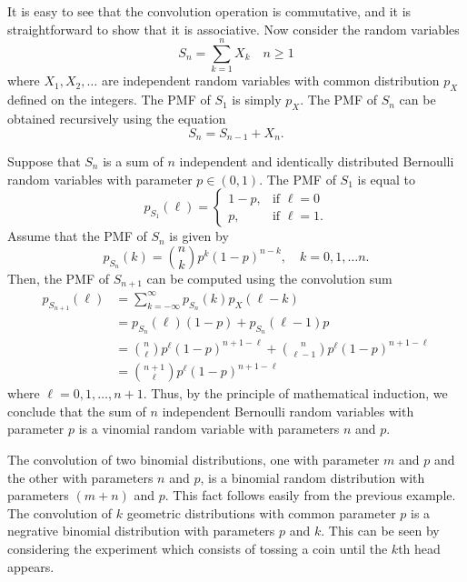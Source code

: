 It is easy to see that the convolution operation is commutative, and it is straightforward to show that it is associative.
Now consider the random variables
\begin{equation*}
S_n = \sum_{k=1}^n X_k \quad n \geq 1
\end{equation*}
where $X_1, X_2, \ldots$ are independent random variables with common distribution $p_X$ defined on the integers.
The PMF of $S_1$ is simply $p_X$.
The PMF of $S_n$ can be obtained recursively using the equation
\begin{equation*}
S_n = S_{n-1} + X_n .
\end{equation*}

\begin{example}
Suppose that $S_n$ is a sum of $n$ independent and identically distributed Bernoulli random variables with parameter $p \in (0,1)$.
The PMF of $S_1$ is equal to
\begin{equation*}
p_{S_1} (\ell) = \begin{cases}
1 - p, & \text{if }\ell = 0 \\p, & \text{if }\ell = 1 .
\end{cases}
\end{equation*}
Assume that the PMF of $S_n$ is given by
\begin{equation*}
p_{S_n} (k)
= \binom{n}{k} p^k (1-p)^{n-k} ,
\quad k = 0, 1, \ldots n.
\end{equation*}
Then, the PMF of $S_{n+1}$ can be computed using the convolution sum
\begin{equation*}
\begin{split}
p_{S_{n+1}} (\ell) &= \sum_{k = - \infty}^{\infty} p_{S_n}(k) p_X(\ell-k) \\
&= p_{S_n}(\ell) (1-p) + p_{S_n}(\ell-1) p \\
&= \binom{n}{\ell} p^{\ell} (1-p)^{n+1-\ell} + \binom{n}{\ell-1} p^{\ell} (1-p)^{n+1-\ell} \\
&= \binom{n+1}{\ell} p^{\ell} (1-p)^{n+1-\ell}
\end{split}
\end{equation*}
where $\ell = 0, 1, \ldots, n+1$.
Thus, by the principle of mathematical induction, we conclude that the sum of $n$ independent Bernoulli random variables with parameter $p$ is a vinomial random variable with parameters $n$ and $p$.
\end{example}

The convolution of two binomial distributions, one with parameter $m$ and $p$ and the other with parameters $n$ and $p$, is a binomial random distribution with parameters $(m+n)$ and $p$.
This fact follows easily from the previous example.
The convolution of $k$ geometric distributions with common parameter $p$ is a negrative binomial distribution with parameters $p$ and $k$.
This can be seen by considering the experiment which consists of tossing a coin until the $k$th head appears.


